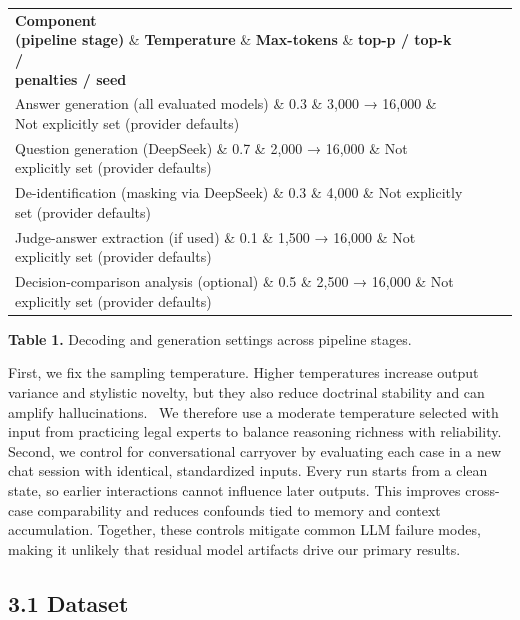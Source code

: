 {{{{{{\begin{longtable}[]{@{}llll@{}}
\toprule
\endhead
\textbf{Component\\
(pipeline stage)} \& \textbf{Temperature} \& \textbf{Max-tokens} \& \textbf{top-p / top-k /\\
penalties / seed} \\
Answer generation (all evaluated models) \& 0.3 \& 3,000 → 16,000 \& Not explicitly set (provider defaults) \\
Question generation (DeepSeek) \& 0.7 \& 2,000 → 16,000 \& Not explicitly set (provider defaults) \\
De-identification (masking via DeepSeek) \& 0.3 \& 4,000 \& Not explicitly set (provider defaults) \\
Judge-answer extraction (if used) \& 0.1 \& 1,500 → 16,000 \& Not explicitly set (provider defaults) \\
Decision-comparison analysis (optional) \& 0.5 \& 2,500 → 16,000 \& Not explicitly set (provider defaults) \\
\bottomrule
\end{longtable}

\textbf{Table} \textbf{1.} Decoding and generation settings across pipeline stages.

First, we fix the sampling temperature. Higher temperatures increase output variance and stylistic novelty, but they also reduce doctrinal stability and can amplify hallucinations.~\cite{ref81} We therefore use a moderate temperature selected with input from practicing legal experts to balance reasoning richness with reliability. Second, we control for conversational carryover by evaluating each case in a new chat session with identical, standardized inputs. Every run starts from a clean state, so earlier interactions cannot influence later outputs. This improves cross-case comparability and reduces confounds tied to memory and context accumulation. Together, these controls mitigate common LLM failure modes, making it unlikely that residual model artifacts drive our primary results.

\hypertarget{dataset}{%
\subsection{\texorpdfstring{\textbf{3.1 Dataset} }{3.1 Dataset }}\label{dataset}

}}}}}}}
